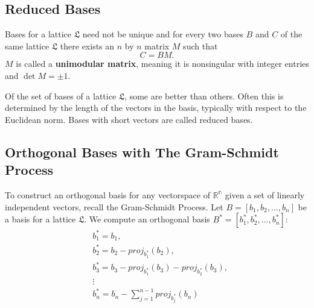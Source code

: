 \documentclass[12pt]{article}
\numberwithin{equation}{section}
\numberwithin{table}{section}
\numberwithin{figure}{section}
\begin{document}
\subsection{Reduced Bases}
Bases for a lattice $\mathfrak{L}$ need not be unique and for every two bases $B$ and $C$ of the same lattice $\mathfrak{L}$ there exists an $n$ by $n$ matrix $M$ such that
$$C=BM.$$
$M$ is called a \textbf{unimodular matrix}, meaning it is nonsingular with integer entries and $\det{M}=\pm 1$.

Of the set of bases of a lattice $\mathfrak{L}$, some are better than others. Often this is determined by the length of the vectors in the basis, typically with respect to the Euclidean norm. Bases with short vectors are called reduced bases.

\subsection{Orthogonal Bases with The Gram-Schmidt Process}
To construct an orthogonal basis for any vectorspace of $\mathbb{R^n}$ given a set of linearly independent vectors, recall the Gram-Schmidt Process. Let $B=[b_1,b_2,\ldots,b_n]$ be a basis for a lattice $\mathfrak{L}$. We compute an orthogonal basis $B^*=[b^*_1,b^*_2,\ldots,b^*_n]$:
\begin{align*}
&b^*_1=b_1,\\
&b^*_2=b_2-{proj}_{b^*_1}(b_2),\\
&b^*_3=b_3-{proj}_{b^*_1}(b_3)-{proj}_{b^*_2}(b_3),\\
&\vdots\\
&b^*_n=b_n-\sum_{j=1}^{n-1} {proj}_{b^*_j}(b_n)
\end{align*}
\end{document}
